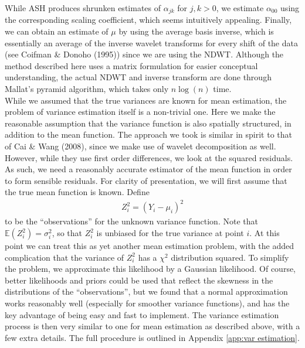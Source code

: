 \documentclass[12pt]{article}
\newcommand{\Ga}{\alpha}
\newcommand{\s}{\sigma}
\begin{document}
While ASH produces shrunken estimates of $\Ga_{jk}$ for $j,k>0$, we estimate $\Ga_{00}$ using the corresponding scaling coefficient, which seems intuitively appealing. Finally, we can obtain an estimate of $\mu$ by using the average basis inverse, which is essentially an average of the inverse wavelet transforms for every shift of the data (see Coifman \& Donoho (1995)) since we are using the NDWT. Although the method described here uses a matrix formulation for easier conceptual understanding, the actual NDWT and inverse transform are done through Mallat's pyramid algorithm, which takes only $n\log(n)$ time.\bigskip\\
While we assumed that the true variances are known for mean estimation, the problem of variance estimation itself is a non-trivial one. Here we make the reasonable assumption that the variance function is also spatially structured, in addition to the mean function. The approach we took is similar in spirit to that of Cai \& Wang (2008), since we make use of wavelet decomposition as well. However, while they use first order differences, we look at the squared residuals. As such, we need a reasonably accurate estimator of the mean function in order to form sensible residuals. For clarity of presentation, we will first assume that the true mean function is known. Define
\begin{eqnarray}\label{eq:varobs1}
Z_i^2=(Y_i-\mu_i)^2
\end{eqnarray}
to be the ``observations'' for the unknown variance function. Note that $\mathbb{E}(Z_i^2)=\s_i^2$, so that $Z_i^2$ is unbiased for the true variance at point $i$. At this point we can treat this as yet another mean estimation problem, with the added complication that the variance of $Z_i^2$ has a $\chi^2$ distribution squared. To simplify the problem, we approximate this likelihood by a Gaussian likelihood. Of course, better likelihoods and priors could be used that reflect the skewness in the distributions of the ``observations'', but we found that a normal approximation works reasonably well (especially for smoother variance functions), and has the key advantage of being easy and fast to implement. The variance estimation process is then very similar to one for mean estimation as described above, with a few extra details. The full procedure is outlined in Appendix \ref{app:var estimation}.\bigskip\\
\end{document}
